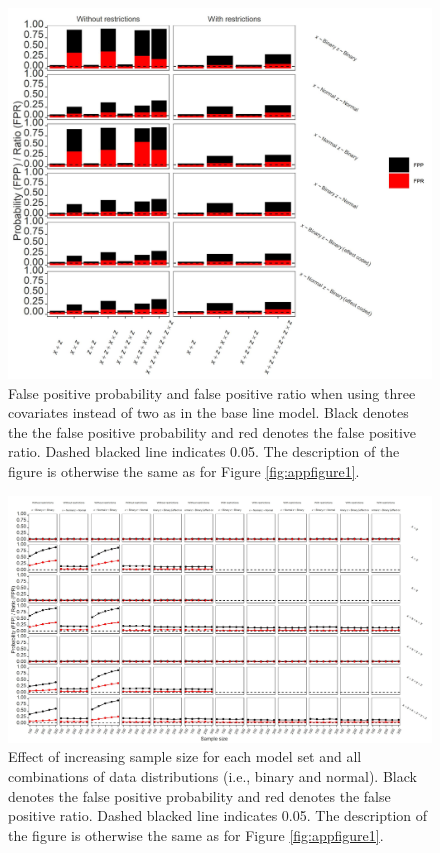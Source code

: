 \begin{figure}[hbt!]
\includegraphics[scale=0.95]{R/Analysis/Result/Figures/Figure1CSI.jpeg}
\centering
\caption{False positive probability and false positive ratio when using three covariates instead of two as in the base line model. Black denotes the the false positive probability and red denotes the false positive ratio. Dashed blacked line indicates 0.05. The description of the figure is otherwise the same as for Figure \ref{fig:appfigure1}.
}
\label{fig:appfigure5}
\end{figure}

\begin{landscape}

\end{landscape}

\begin{landscape}
\begin{figure}[hbt!]
\includegraphics[scale=0.75]{R/Analysis/Result/Figures/Figure1DSI.jpeg}
\centering
\caption{Effect of increasing sample size for each model set and all combinations of data distributions (i.e., binary and normal). Black denotes the false positive probability and red denotes the false positive ratio. Dashed blacked line indicates 0.05. The description of the figure is otherwise the same as for Figure \ref{fig:appfigure1}.}
\label{fig:appfigure6}
\end{figure}
\end{landscape}


